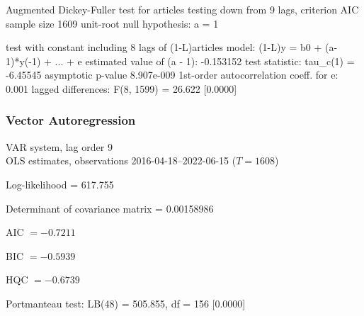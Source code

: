 Augmented Dickey-Fuller test for articles
testing down from 9 lags, criterion AIC
sample size 1609
unit-root null hypothesis: a = 1

test with constant 
including 8 lags of (1-L)articles
model: (1-L)y = b0 + (a-1)*y(-1) + ... + e
estimated value of (a - 1): -0.153152
test statistic: tau\_c(1) = -6.45545
asymptotic p-value 8.907e-009
1st-order autocorrelation coeff. for e: 0.001
lagged differences: F(8, 1599) = 26.622 [0.0000]

\subsubsection{Vector Autoregression}

\begin{center}
VAR system, lag order 9\\
OLS estimates, observations 2016-04-18--2022-06-15 ($T=1608$)
\end{center}
\noindent
Log-likelihood = 617.755\par
\noindent
Determinant of covariance matrix = 0.00158986\par
\noindent
AIC $= -0.7211$ \par
\noindent
BIC $= -0.5939$ \par
\noindent
HQC $= -0.6739$ \par
\noindent
Portmanteau test: LB(48) = 505.855, df = 156 [0.0000]\par
